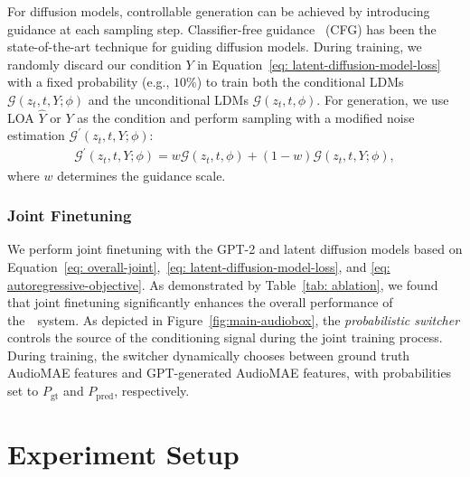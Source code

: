 \documentclass[lettersize,journal]{IEEEtran}
\begin{document}
For diffusion models, controllable generation can be achieved by introducing guidance at each sampling step. Classifier-free guidance~\cite{CFG,Glide} (CFG) has been the state-of-the-art technique for guiding diffusion models.
During training, we randomly discard our condition $Y$ in Equation~\eqref{eq: latent-diffusion-model-loss} with a fixed probability (e.g., $10\%$) to train both the conditional LDMs $\mathcal{G}(z_{t}, t, Y; \phi)$ and the unconditional LDMs $\mathcal{G}(z_{t}, t, \phi)$. For generation, we use LOA $\hat{Y}$ or $Y$ as the condition and perform sampling with a modified noise estimation $\mathcal{G^{\prime}}(z_{t}, t, Y; \phi)$:
\begin{align}
\mathcal{G^{\prime}}(z_{t}, t, Y; \phi) = w\mathcal{G}(z_{t}, t, \phi)+(1-w)\mathcal{G}(z_{t}, t, Y; \phi),
\end{align}
where $w$ determines the guidance scale.



\subsubsection{Joint Finetuning}

\label{sec: joint-training}
We perform joint finetuning with the GPT-2 and latent diffusion models based on Equation~\eqref{eq: overall-joint},~\eqref{eq: latent-diffusion-model-loss}, and \eqref{eq: autoregressive-objective}. As demonstrated by Table~\ref{tab: ablation}, we found that joint finetuning significantly enhances the overall performance of the~\vModelName~system. As depicted in Figure~\ref{fig:main-audiobox}, the \textit{probabilistic switcher} controls the source of the conditioning signal during the joint training process. During training, the switcher dynamically chooses between ground truth AudioMAE features and GPT-generated AudioMAE features, with probabilities set to $P_{\text{gt}}$ and $P_{\text{pred}}$, respectively.

\section{Experiment Setup}
\end{document}
